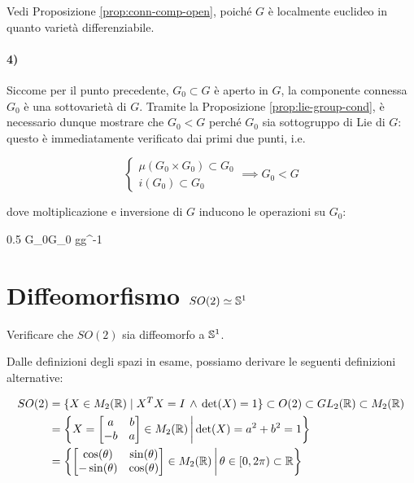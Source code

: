 Vedi Proposizione \ref{prop:conn-comp-open}, poiché $ G $ è localmente euclideo in quanto varietà differenziabile.

\paragraph{4)}

Siccome per il punto precedente, $ G_{0} \subset G $ è aperto in $ G $, la componente connessa $ G_{0} $ è una sottovarietà di $ G $. Tramite la Proposizione \ref{prop:lie-group-cond}, è necessario dunque mostrare che $ G_{0} < G $ perché $ G_{0} $ sia sottogruppo di Lie di $ G $: questo è immediatamente verificato dai primi due punti, i.e.

\begin{equation}
	\begin{cases}
		\mu(G_{0} \times G_{0}) \subset G_{0} \\
		i(G_{0}) \subset G_{0}
	\end{cases} %
	\implies %
	G_{0} < G
\end{equation}

dove moltiplicazione e inversione di $ G $ inducono le operazioni su $ G_{0} $:

	{0.5}{%
				{G_{0}}{G_{0}}
				{g}{g^{-1}}
			}

%

\newpage

%

\section{Diffeomorfismo $ SO(2) \simeq \S^{1} $}\label{BONUS3-1}

\begin{tcolorbox}
	Verificare che $ SO(2) $ sia diffeomorfo a $ \S^{1} $.
\end{tcolorbox}

Dalle definizioni degli spazi in esame, possiamo derivare le seguenti definizioni alternative:

\begin{align}
	\begin{split}
		SO(2) &= \{ X \in M_{2}(\R) \mid X^{T} X = I \, \wedge \, \det(X) = 1 \} \subset O(2) \subset GL_{2}(\R) \subset M_{2}(\R) \\
		&= \left\{ X = \bmqty{ a & b \\ -b & a } \in M_{2}(\R) \st \det(X) = a^{2} + b^{2} = 1 \right\} \\
		&= \left\{ \bmqty{ \cos(\theta) & \sin(\theta) \\ -\sin(\theta) & \cos(\theta) } \in M_{2}(\R) \st \theta \in [0,2\pi) \subset \R \right\}
	\end{split}
\end{align}

